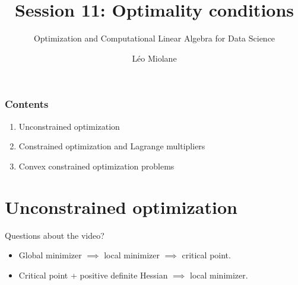 \documentclass{beamer}
\title{Session 11: Optimality conditions}
\subtitle{Optimization and Computational Linear Algebra for Data Science}
\author{Léo Miolane}
\date{}
\begin{document}
\setcounter{showProgressBar}{0}
\setcounter{showSlideNumbers}{0}

\frame{\titlepage}
\setcounter{framenumber}{0}
\setcounter{showSlideNumbers}{1}

\begin{frame}
	\frametitle{Contents}
	\begin{enumerate}
		\item Unconstrained optimization
		\item Constrained optimization and Lagrange multipliers
		\item Convex constrained optimization problems
	\end{enumerate}
\end{frame}

\section{Unconstrained optimization}
\begin{frame}[t]{Questions about the video?}
	\grid

	\vspace{-0.2cm}
	\begin{itemize}
		\item Global minimizer $\implies$ local minimizer $\implies$ critical point.
		\item Critical point + positive definite Hessian $\implies$ local minimizer.
	\end{itemize}

\end{frame}
\end{document}
